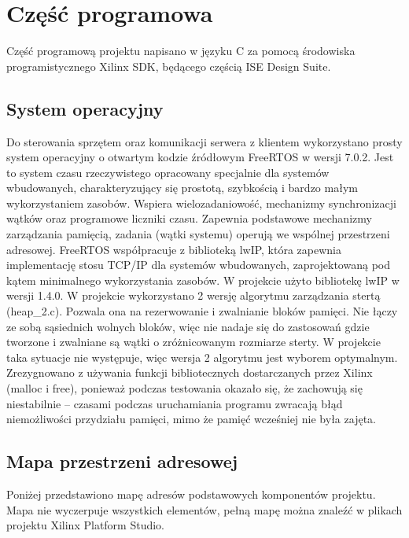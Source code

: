 \documentclass[a4paper,11pt,oneside]{report}  %
\begin{document}
\section{Część programowa}
Część programową projektu napisano w języku C za pomocą środowiska programistycznego Xilinx SDK, będącego częścią ISE Design Suite.

\subsection{System operacyjny} 

Do sterowania sprzętem oraz komunikacji serwera z klientem wykorzystano prosty system operacyjny o otwartym kodzie źródłowym FreeRTOS \cite{9} w wersji 7.0.2. Jest to system czasu rzeczywistego opracowany specjalnie dla systemów wbudowanych, charakteryzujący się prostotą, szybkością i bardzo małym wykorzystaniem zasobów. Wspiera wielozadaniowość, mechanizmy synchronizacji wątków oraz programowe liczniki czasu. Zapewnia podstawowe mechanizmy zarządzania pamięcią, zadania (wątki systemu) operują we wspólnej przestrzeni adresowej. FreeRTOS współpracuje z biblioteką lwIP, która zapewnia implementację stosu TCP/IP dla systemów wbudowanych, zaprojektowaną pod kątem minimalnego wykorzystania zasobów. W projekcie użyto bibliotekę lwIP w wersji 1.4.0. W projekcie wykorzystano 2 wersję algorytmu zarządzania stertą (heap\_2.c). Pozwala ona na rezerwowanie i zwalnianie bloków pamięci. Nie łączy ze sobą sąsiednich wolnych bloków, więc nie nadaje się do zastosowań gdzie tworzone i zwalniane są wątki o zróżnicowanym rozmiarze sterty. W projekcie taka sytuacje nie występuje, więc wersja 2 algorytmu jest wyborem optymalnym. Zrezygnowano z używania funkcji bibliotecznych dostarczanych przez Xilinx (malloc i free), ponieważ podczas testowania okazało się, że zachowują się niestabilnie – czasami podczas uruchamiania programu zwracają błąd niemożliwości przydziału pamięci, mimo że pamięć wcześniej nie była zajęta.

\subsection{Mapa przestrzeni adresowej}
Poniżej przedstawiono mapę adresów podstawowych komponentów projektu. Mapa nie wyczerpuje wszystkich elementów, pełną mapę można znaleźć w plikach projektu Xilinx Platform Studio.
\end{document}
